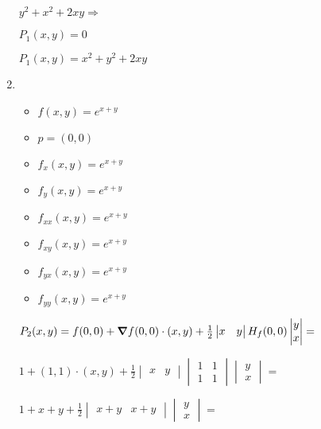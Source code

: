 \documentclass[../practica_05.tex]{subfiles}
\begin{document}
\begin{enumerate}
            $ y^2 + x^2 + 2xy \Rightarrow $

            $ P_1(x,y) = 0 $

            $ P_1(x,y) = x^2 + y^2 + 2xy $

        \item 
            \begin{itemize}
                \item $f(x,y) = e^{x+y}$
                \item $p = (0,0)$
            \end{itemize}

            \begin{itemize}
                \item $f_{x}(x,y) = e^{x+y}$
                \item $f_{y}(x,y) = e^{x+y}$
                \item $f_{xx}(x,y) = e^{x+y} $
                \item $f_{xy}(x,y) = e^{x+y} $
                \item $f_{yx}(x,y) = e^{x+y} $
                \item $f_{yy}(x,y) = e^{x+y} $
            \end{itemize}

            $ P_2(x,y) = f(0,0) + \grad f(0,0)\cdot(x,y) + \frac{1}{2} \begin{vmatrix}
                x & y
            \end{vmatrix} H_f(0,0)  \begin{vmatrix}
                y \\
                x
            \end{vmatrix} = $

            $ 1 + (1,1)\cdot(x,y) + \frac{1}{2} \begin{vmatrix}
                x & y
            \end{vmatrix} \begin{vmatrix}
                1   & 1  \\
                1   & 1
            \end{vmatrix} \begin{vmatrix}
                y \\
                x
            \end{vmatrix} = $

            $ 1 + x + y + \frac{1}{2} \begin{vmatrix}
                x + y   & x + y
            \end{vmatrix} \begin{vmatrix}
                y \\
                x
            \end{vmatrix} =$


\end{enumerate}
\end{document}

